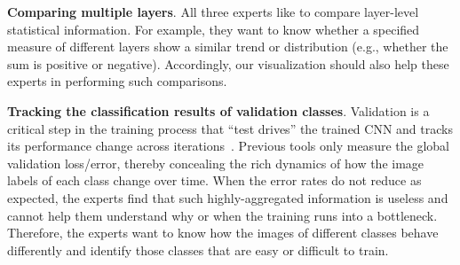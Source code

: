 \documentclass[format=acmsmall, review=false, screen=true]{acmart}
\begin{document}

	\item \textbf{Comparing multiple layers}.
	All three experts like to compare layer-level statistical information.
	For example, they want to know whether a specified measure of different layers show a similar trend or distribution (e.g., whether the sum is positive or negative).
	Accordingly, our visualization should also help these experts in performing such comparisons.

	\item \textbf{Tracking the classification results of validation classes}.
	Validation is a critical step in the training process that ``test drives'' the trained CNN and tracks its performance change across iterations~\cite{bengio2012practical}.
	Previous tools only measure the global validation loss/error, thereby concealing the rich dynamics of how the image labels of each class change over time.
	When the error rates do not reduce as expected, the experts find that such highly-aggregated information is useless and cannot help them understand why or when the training runs into a bottleneck.
	Therefore, the experts want to know how the images of different classes behave differently and identify those classes that are easy or difficult to train.
\end{document}
